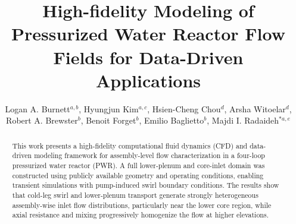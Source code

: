 \documentclass[review]{elsarticle}
\theoremstyle{definition}
\theoremstyle{definition}
\theoremstyle{remark}
\begin{document}
\begin{frontmatter}

\title{\large High-fidelity Modeling of Pressurized Water Reactor Flow Fields for Data-Driven Applications}

\author{Logan A. Burnett$^{a,b}$, Hyungjun Kim$^{a,c}$, Hsien-Cheng Chou$^{d}$, Arsha Witoelar$^{d}$, Robert A. Brewster$^{b}$, Benoit Forget$^{b}$, Emilio Baglietto$^{b}$, Majdi I. Radaideh$^{*a,e}$}


\address{$^a$Department of Nuclear Engineering and Radiological Sciences, University of Michigan, Ann Arbor, MI 48109, United States}
\address{$^b$Department of Nuclear Science and Engineering, Massachusetts Institute of Technology, Cambridge, MA 02139, United States}
\address{$^c$Korea Atomic Energy Research Institute, Daejeon, 34057, South Korea}
\address{$^d$Department of Mechanical Engineering, University of Michigan, Ann Arbor, MI 48109, United States}
\address{$^e$Department of Computer Science and Engineering, University of Michigan, Ann Arbor, MI 48109, United States}





\begin{abstract}
\small
This work presents a high-fidelity computational fluid dynamics (CFD) and data-driven modeling framework for assembly-level flow characterization in a four-loop pressurized water reactor (PWR). A full lower-plenum and core-inlet domain was constructed using publicly available geometry and operating conditions, enabling transient simulations with pump-induced swirl boundary conditions. The results show that cold-leg swirl and lower-plenum transport generate strongly heterogeneous assembly-wise inlet flow distributions, particularly near the lower core region, while axial resistance and mixing progressively homogenize the flow at higher elevations.


\end{abstract}
\end{frontmatter}
\end{document}
